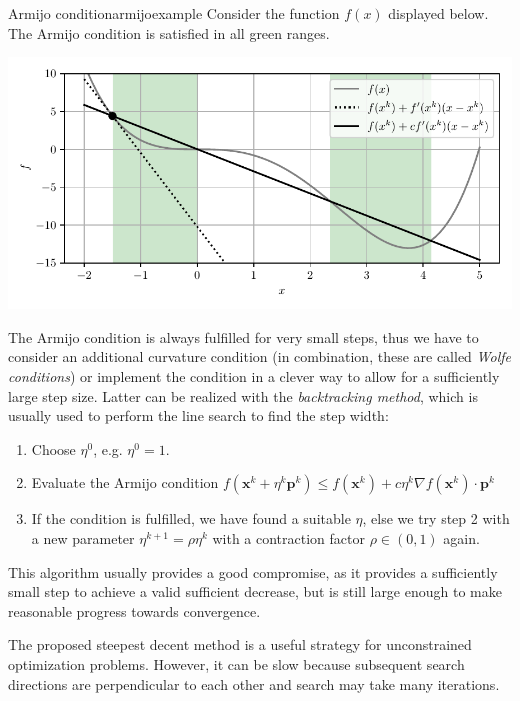 \begin{example}{Armijo condition}{armijoexample}
    Consider the function $f(x)$ displayed below. The Armijo condition is satisfied in all green ranges.  
    
    \includegraphics[width=\textwidth]{figures/armijo_condition.pdf}
\end{example}

The Armijo condition is always fulfilled for very small steps, thus we have to consider an additional curvature condition (in combination, these are called \emph{Wolfe conditions}) or implement the condition in a clever way to allow for a sufficiently large step size. Latter can be realized with the \emph{backtracking method}, which is usually used to perform the line search to find the step width: 
\begin{enumerate}
    \item Choose $\eta^0$, e.g. $\eta^0=1$.
    \item Evaluate the Armijo condition $f(\mathbf{x}^k + \eta^k \mathbf{p}^k) \le f(\mathbf{x}^k) + c \eta^k \nabla f(\mathbf{x}^k) \cdot \mathbf{p}^k $
    \item If the condition is fulfilled, we have found a suitable $\eta$, else we try step 2 with a new parameter $\eta^{k+1}=\rho \eta^k$ with a contraction factor $\rho \in (0,1)$ again.
\end{enumerate}
This algorithm usually provides a good compromise, as it provides a sufficiently small step to achieve a valid sufficient decrease, but is still large enough to make reasonable progress towards convergence.

The proposed steepest decent method is a useful strategy for unconstrained optimization problems. However, it can be slow because subsequent search directions are perpendicular to each other and search may take many iterations.


